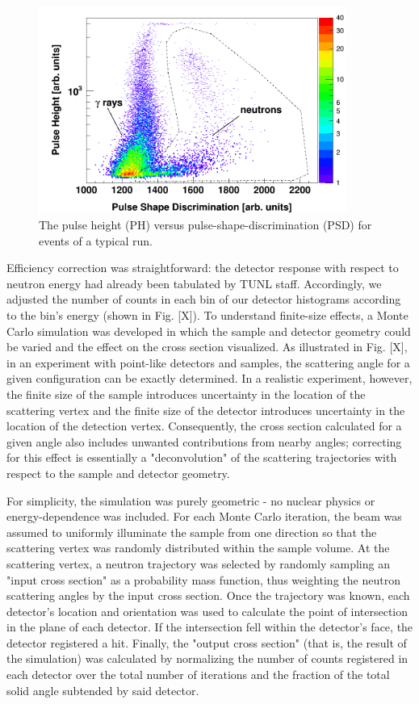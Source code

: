 \begin{figure}
    \includegraphics[width=0.9\textwidth]{figures/PHPSDPlot.png}
    \caption{The pulse height (PH) versus pulse-shape-discrimination (PSD) for
    events of a typical run.}
    \label{PHPSDPlot}
\end{figure}

Efficiency correction was straightforward: the detector response with respect to
neutron energy had already been tabulated by TUNL staff. Accordingly, we
adjusted the number of counts in each bin of our detector histograms according
to the bin's energy (shown in Fig. [X]). To understand finite-size effects, a
Monte Carlo simulation was developed in which the sample and detector geometry
could be varied and the effect on the cross section visualized. As illustrated
in Fig. [X], in an experiment with point-like detectors and
samples, the scattering angle for a given configuration can be exactly
determined. In a realistic experiment, however, the finite size of the sample
introduces uncertainty in the location of the scattering vertex and the finite size of the
detector introduces uncertainty in the location of the detection vertex. Consequently, the cross
section calculated for a given angle also includes unwanted contributions
from nearby angles; correcting for this effect is essentially a "deconvolution"
of the scattering trajectories with respect to the sample and detector geometry.

For simplicity, the simulation was purely geometric - no nuclear physics or
energy-dependence was included. For each Monte Carlo iteration, the beam was
assumed to uniformly illuminate
the sample from one direction so that the scattering vertex was randomly
distributed within the sample volume. At the scattering vertex, a neutron
trajectory was selected by randomly sampling an "input cross section" as a
probability mass function, thus weighting the neutron scattering angles by the
input cross section.  Once the trajectory was known, each detector's location
and orientation was used to calculate the point of intersection in the plane of each detector. If the
intersection fell within the detector's face, the detector registered a hit.
Finally, the "output cross section" (that is, the result of the simulation)
was calculated by normalizing the number of counts registered in each detector
over the total number of iterations and the fraction of the total solid angle
subtended by said detector.

